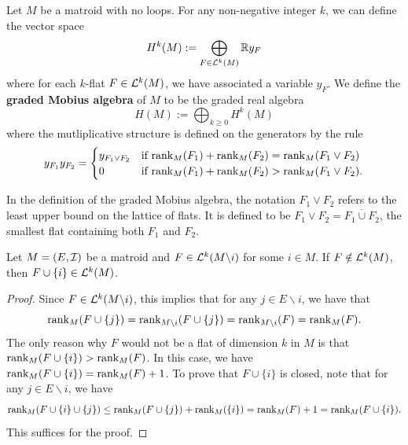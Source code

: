 \documentclass{puthesis-UG}
\begin{document}
\begin{defn}
	Let $M$ be a matroid with no loops. For any non-negative integer $k$, we can define the vector space
	\[
		H^k(M) := \bigoplus_{F \in \mathcal{L}^k(M)} \mathbb{R} y_F
	\]
	where for each $k$-flat $F \in \mathcal{L}^k(M)$, we have associated a variable $y_F$. We define the \textbf{graded Mobius algebra} of $M$ to be the graded real algebra
	\[
		H(M) := \bigoplus_{k \geq 0} H^k(M)
	\]
	where the mutliplicative structure is defined on the generators by the rule
	\[
		y_{F_1} y_{F_2} = \begin{cases}
			y_{F_1 \vee F_2} & \text{if $\operatorname{rank}_M(F_1) + \operatorname{rank}_M(F_2) = \operatorname{rank}_M (F_1 \vee F_2)$} \\
			0 & \text{if $\operatorname{rank}_M(F_1) + \operatorname{rank}_M(F_2) > \operatorname{rank}_M(F_1 \vee F_2)$}.
		\end{cases}
	\]
\end{defn}
In the definition of the graded Mobius algebra, the notation $F_1 \vee F_2$ refers to the least upper bound on the lattice of flats. It is defined to be $F_1 \vee F_2 = \overline{F_1 \cup F_2}$, the smallest flat containing both $F_1$ and $F_2$. 

\begin{lem}
	Let $M = (E, \mathcal{I})$ be a matroid and $F \in \mathcal{L}^k (M \backslash i)$ for some $i \in M$. If $F \notin \mathcal{L}^k(M)$, then $F \cup \{i\} \in \mathcal{L}^k(M)$. 
\end{lem}

\begin{proof}
	Since $F \in \mathcal{L}^k(M \backslash i)$, this implies that for any $j \in E \backslash i$, we have that 
	\[
		\operatorname{rank}_{M}(F \cup \{j\}) = \operatorname{rank}_{M \backslash i} (F \cup \{j\}) = \operatorname{rank}_{M \backslash i} (F) = \operatorname{rank}_M (F).
	\]
	The only reason why $F$ would not be a flat of dimension $k$ in $M$ is that $\operatorname{rank}_M(F \cup \{i\}) > \operatorname{rank}_M (F)$. In this case, we have $\operatorname{rank}_M (F \cup \{i\}) = \operatorname{rank}_M(F) + 1$. To prove that $F \cup \{i\}$ is closed, note that for any $j \in E \backslash i$, we have 
	\[
		\operatorname{rank}_M (F \cup \{i\} \cup \{j\}) \leq \operatorname{rank}_M (F \cup \{j\}) + \operatorname{rank}_M(\{i\}) = \operatorname{rank}_M(F) + 1 = \operatorname{rank}_M(F \cup \{i\}).
	\]
	This suffices for the proof. 
\end{proof}
\end{document}
